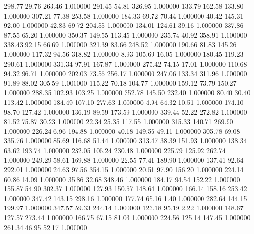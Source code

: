     298.77     29.76    263.46  1.000000
    291.45     54.81    326.95  1.000000
    133.79    162.58    133.80  1.000000
    307.21     77.38    253.58  1.000000
    184.33     69.72     70.44  1.000000
     40.42    145.31     92.00  1.000000
     42.83     69.72    204.55  1.000000
    134.01    124.61     39.16  1.000000
    337.86     87.55     65.20  1.000000
    350.37    149.55    113.45  1.000000
    235.74     40.92    358.91  1.000000
    338.43     92.15     66.69  1.000000
    321.39     83.66    248.52  1.000000
    190.66     81.83    145.26  1.000000
    117.32     94.56    318.82  1.000000
      8.93    105.69     16.05  1.000000
    180.45    119.23    290.61  1.000000
    331.34     97.91    167.87  1.000000
    275.42     74.15     17.01  1.000000
    110.68     94.32     96.71  1.000000
    202.03     73.56    256.17  1.000000
    247.06    133.34    311.96  1.000000
     91.89     88.02    305.59  1.000000
    115.22     70.18    104.77  1.000000
    159.12     73.79    150.27  1.000000
    288.35    102.93    103.25  1.000000
    352.78    145.50    232.40  1.000000
     80.40     30.40    113.42  1.000000
    184.49    107.10    277.63  1.000000
      4.94     64.32     10.51  1.000000
    174.10     98.70    127.42  1.000000
    136.19     89.59    173.59  1.000000
    339.44     52.22    272.82  1.000000
     81.52     75.87     30.23  1.000000
     22.34     25.35    117.55  1.000000
    315.33    140.71    269.90  1.000000
    226.24      6.96    194.88  1.000000
     40.18    149.56     49.11  1.000000
    305.78     69.08    335.76  1.000000
     85.69    116.68     51.44  1.000000
    313.47     38.39    151.93  1.000000
    138.34     63.62    193.74  1.000000
    232.05    105.24    230.48  1.000000
    225.79    125.92    262.74  1.000000
    249.29     58.61    169.88  1.000000
     22.55     77.41    189.90  1.000000
    137.41     92.64    292.01  1.000000
     24.63     97.56    354.15  1.000000
     20.51     97.90    156.20  1.000000
    224.14     60.86     14.09  1.000000
     35.86     32.68    348.46  1.000000
    184.17     94.54    152.22  1.000000
    155.87     54.90    302.37  1.000000
    127.93    150.67    148.64  1.000000
    166.14    158.16    253.42  1.000000
    347.42    143.15    298.16  1.000000
    177.74     65.16      1.40  1.000000
    282.64    144.15    199.97  1.000000
    347.57     59.33    244.14  1.000000
    123.18     95.19      2.22  1.000000
    148.67    127.57    273.44  1.000000
    166.75     67.15     81.03  1.000000
    224.56    125.14    147.45  1.000000
    261.34     46.95     52.17  1.000000
